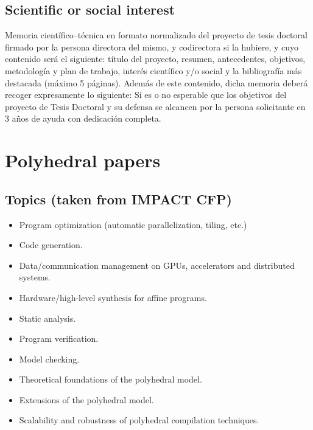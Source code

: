 \documentclass[a4paper, 11pt]{article}
\begin{document}
\subsection{Scientific or social interest}

 Memoria científico–técnica en formato normalizado del proyecto de tesis doctoral firmado por la persona directora del mismo, y codirectora si la hubiere, y cuyo contenido será el siguiente: título del proyecto, resumen, antecedentes, objetivos, metodología y plan de trabajo, interés científico y/o social y la bibliografía más destacada (máximo 5 páginas). Además de este contenido, dicha memoria deberá recoger expresamente lo siguiente: Si es o no esperable que los objetivos del proyecto de Tesis Doctoral y su defensa se alcancen por la persona solicitante en 3 años de ayuda con dedicación completa.


\section{Polyhedral papers}\label{sec:polly_papers}
\subsection{Topics (taken from IMPACT CFP)}
\begin{itemize}
    \item Program optimization (automatic parallelization, tiling, etc.)
    \item Code generation.
    \item Data/communication management on GPUs, accelerators and distributed systems.
    \item Hardware/high-level synthesis for affine programs.
    \item Static analysis.
    \item Program verification.
    \item Model checking.
    \item Theoretical foundations of the polyhedral model.
    \item Extensions of the polyhedral model.
    \item Scalability and robustness of polyhedral compilation techniques.
\end{itemize}
\end{document}
